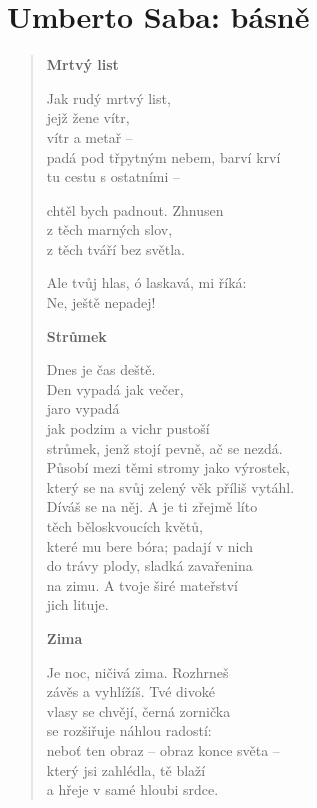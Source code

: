 \section{Umberto Saba: básně}

\begin{verse}
\textbf{Mrtvý list}

\smallskip

Jak rudý mrtvý list, \\
jejž žene vítr,\\
vítr a metař –  \\
padá pod třpytným nebem, barví krví \\
tu cestu s ostatními –

\medskip

chtěl bych padnout. Zhnusen\\
z těch marných slov, \\
 z těch tváří bez světla.

\medskip

Ale tvůj hlas, ó laskavá, mi říká:\\
Ne, ještě nepadej!

\bigskip

\textbf{Strůmek}

\smallskip

Dnes je čas deště.\\
Den vypadá jak večer,\\
jaro vypadá\\
jak podzim a vichr pustoší\\
strůmek, jenž stojí pevně, ač se nezdá.\\
Působí mezi těmi stromy jako výrostek,\\
který se na svůj zelený věk příliš vytáhl.\\
Díváš se na něj. A je ti zřejmě líto\\
těch běloskvoucích květů,\\
které mu bere bóra; padají v nich\\
do trávy plody, sladká zavařenina\\
na zimu. A tvoje širé mateřství\\
jich lituje.

\bigskip

\textbf{Zima}

\smallskip

Je noc, ničivá zima. Rozhrneš\\
závěs a vyhlížíš. Tvé divoké\\
vlasy se chvějí, černá zornička\\
se rozšiřuje náhlou radostí:\\
neboť ten obraz – obraz konce světa –\\
který jsi zahlédla, tě blaží\\
a hřeje v samé hloubi srdce.


\end{verse}
